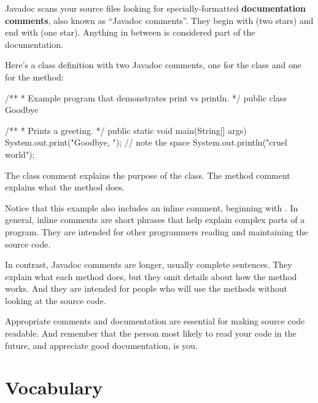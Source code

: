 Javadoc scans your source files looking for specially-formatted {\bf documentation comments}, also known as ``Javadoc comments''.
They begin with \java{/**} (two stars) and end with \java{*/} (one star).
Anything in between is considered part of the documentation.

Here's a class definition with two Javadoc comments, one for the class and one for the  method:

\begin{code}
/**
 * Example program that demonstrates print vs println.
 */
public class Goodbye {

    /**
     * Prints a greeting.
     */
    public static void main(String[] args) {
        System.out.print("Goodbye, ");  // note the space
        System.out.println("cruel world");
    }
}
\end{code}

The class comment explains the purpose of the class.
The method comment explains what the method does.

Notice that this example also includes an inline comment, beginning with \java{//}.
In general, inline comments are short phrases that help explain complex parts of a program.
They are intended for other programmers reading and maintaining the source code.

In contrast, Javadoc comments are longer, usually complete sentences.
They explain what each method does, but they omit details about how the method works.
And they are intended for people who will use the methods without looking at the source code.

Appropriate comments and documentation are essential for making source code readable.
And remember that the person most likely to read your code in the future, and appreciate good documentation, is you.


\section{Vocabulary}

